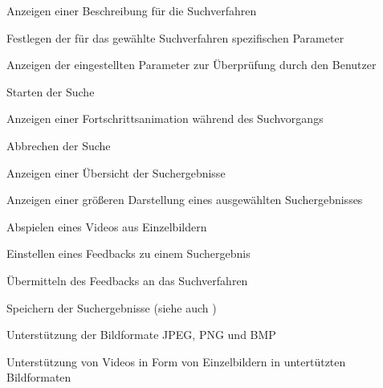 \begin{description}
	\item[] Anzeigen einer Beschreibung für die Suchverfahren
	\item[] Festlegen der für das gewählte Suchverfahren spezifischen Parameter
	\item[] Anzeigen der eingestellten Parameter zur Überprüfung durch den Benutzer
	\newline
	\item[] Starten der Suche
	\item[] Anzeigen einer Fortschrittsanimation während des Suchvorgangs
	\item[] Abbrechen der Suche
	\newline
	\item[] Anzeigen einer \"Ubersicht der Suchergebnisse
	\item[] Anzeigen einer größeren Darstellung eines ausgewählten Suchergebnisses
	\item[] Abspielen eines Videos aus Einzelbildern
	\item[] Einstellen eines Feedbacks zu einem Suchergebnis
	\item[] \"Ubermitteln des Feedbacks an das Suchverfahren
	\item[] Speichern der Suchergebnisse (siehe auch )
	\newline
	\item[] Unterstützung der Bildformate JPEG, PNG und BMP
	\item[] Unterstützung von Videos in Form von Einzelbildern in untert\"utzten Bildformaten
\end{description}

